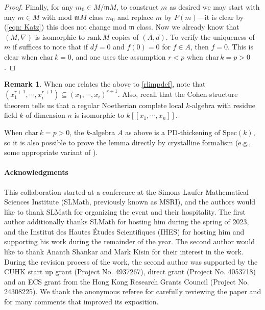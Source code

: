\documentclass[letter, 11pt]{article}
\theoremstyle{plain}
\theoremstyle{definition}
\newtheorem{remark}[subsubsection]{Remark}
\newcommand{\Spec}{\mathrm{Spec}}
\newcommand{\<}{\langle}
\renewcommand{\>}{\rangle}
\newcommand{\fm}{\mathfrak{m}}
\begin{document}
\begin{proof}
Finally, for any $m_0 \in M/ \fm M$, to construct $m$ as desired we may start with any $m \in M$ with mod $\fm M$ class $m_0$ and replace $m$ by $P(m)$---it is clear by (\ref{eqn: Katz}) this does not change mod $\fm$ class. Now we already know that $(M, \nabla)$ is isomorphic to $\mathrm{rank\,} M$ copies of $(A, d)$. To verify the uniqueness of $m$ if suffices to note that if $d f = 0$ and $f(0) = 0$ for $f \in A$, then $f = 0$. This is clear when $\mathrm{char\,} k = 0$, and one uses the assumption $r < p$ when $\mathrm{char\,} k =p > 0$. 
\end{proof}

\begin{remark}
    When one relates the above to \ref{rlimpdef}, note that $(x_1^{r + 1}, \cdots, x_i^{r + 1}) \subseteq (x_1, \cdots, x_i)^{r + 1}$. Also, recall that the Cohen structure theorem \cite[0C0S]{stacks-project} tells us that a regular Noetherian complete local $k$-algebra with residue field $k$ of dimension $n$ is isomorphic to $k[\![x_1, \cdots, x_n]\!]$.

    When $\mathrm{char\,}{k} = p > 0$, the $k$-algebra $A$ as above is a PD-thickening of $\Spec(k)$, so it is also possible to prove the lemma directly by crystalline formalism (e.g., some appropriate variant of \cite[07JH]{stacks-project}). 
\end{remark}



\paragraph{Acknowledgments} This collaboration started at a conference at the Simons-Laufer Mathematical Sciences
Institute (SLMath, previously known as MSRI), and the authors would like to thank SLMath for organizing
the event and their hospitality. The first author additionally thanks SLMath for hosting him during the spring
of 2023, and the Institut des Hautes Études Scientifiques (IHES) for hosting him and supporting his work
during the remainder of the year. The second author would like to thank Ananth Shankar and Mark Kisin
for their interest in the work. During the revision process of the work, the second author was supported
by the CUHK start up grant (Project No. 4937267), direct grant (Project No. 4053718) and an ECS grant
from the Hong Kong Research Grants Council (Project No. 24308225). We thank the anonymous referee
for carefully reviewing the paper and for many comments that improved its exposition.
\end{document}
